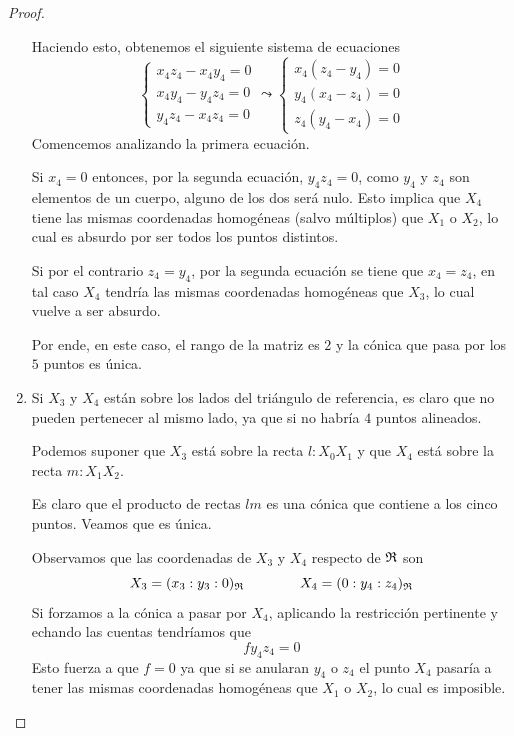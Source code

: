\begin{proof}
\begin{enumerate}
	Haciendo esto, obtenemos el siguiente sistema de ecuaciones
	\begin{equation}
		\left\{
			\begin{array}{l}
			x_4z_4-x_4y_4=0\\
			x_4y_4-y_4z_4=0\\
			y_4z_4-x_4z_4=0
			\end{array}
		\right.\leadsto\left\{
		\begin{array}{l}
		x_4(z_4-y_4)=0\\
		y_4(x_4-z_4)=0\\
		z_4(y_4-x_4)=0
		\end{array}
		\right.
	\end{equation}
	Comencemos analizando la primera ecuación.
	
	Si $x_4=0$ entonces, por la segunda ecuación, $y_4z_4=0$, como $y_4$ y $z_4$ son elementos de un cuerpo, alguno de los dos será nulo. Esto implica que $X_4$ tiene las mismas coordenadas homogéneas (salvo múltiplos) que $X_1$ o $X_2$, lo cual es absurdo por ser todos los puntos distintos.
	
	Si por el contrario $z_4=y_4$, por la segunda ecuación se tiene que $x_4=z_4$, en tal caso $X_4$ tendría las mismas coordenadas homogéneas que $X_3$, lo cual vuelve a ser absurdo.
	
	Por ende, en este caso, el rango de la matriz es $2$ y la cónica que pasa por los $5$ puntos es única.
		\item Si $X_3$ y $X_4$ están sobre los lados del triángulo de referencia, es claro que no pueden pertenecer al mismo lado, ya que si no habría $4$ puntos alineados.
		
		Podemos suponer que $X_3$ está sobre la recta $l:X_0X_1$ y que $X_4$ está sobre la recta $m:X_1X_2$.
		
		Es claro que el producto de rectas $lm$ es una cónica que contiene a los cinco puntos. Veamos que es única.
		
		Observamos que las coordenadas de $X_3$ y $X_4$ respecto de $\mathfrak{R}$ son
		\begin{equation}
			X_3=(x_3:y_3:0)_{\mathfrak{R}}\qquad \qquad X_4=(0:y_4:z_4)_{\mathfrak{R}}
		\end{equation}
		Si forzamos a la cónica a pasar por $X_4$, aplicando la restricción pertinente y echando las cuentas tendríamos que
		\begin{equation*}
			fy_4z_4=0
		\end{equation*}
		Esto fuerza a que $f=0$ ya que si se anularan $y_4$ o $z_4$ el punto $X_4$ pasaría a tener las mismas coordenadas homogéneas que $X_1$ o $X_2$, lo cual es imposible.
		

\end{enumerate}
\end{proof}
